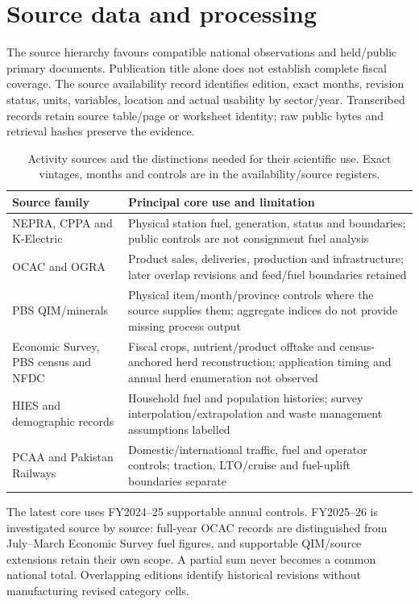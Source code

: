 \section{Source data and processing}\label{sec:sources}
The source hierarchy favours compatible national observations and held/public primary documents. Publication title alone does not establish complete fiscal coverage. The source availability record identifies edition, exact months, revision status, units, variables, location and actual usability by sector/year. Transcribed records retain source table/page or worksheet identity; raw public bytes and retrieval hashes preserve the evidence.

\begin{table}[htbp]\centering\small
\begin{tabular}{@{}p{.25\linewidth}p{.64\linewidth}@{}}\toprule
Source family & Principal core use and limitation\\\midrule
NEPRA, CPPA and K-Electric & Physical station fuel, generation, status and boundaries; public controls are not consignment fuel analysis\\
OCAC and OGRA & Product sales, deliveries, production and infrastructure; later overlap revisions and feed/fuel boundaries retained\\
PBS QIM/minerals & Physical item/month/province controls where the source supplies them; aggregate indices do not provide missing process output\\
Economic Survey, PBS census and NFDC & Fiscal crops, nutrient/product offtake and census-anchored herd reconstruction; application timing and annual herd enumeration not observed\\
HIES and demographic records & Household fuel and population histories; survey interpolation/extrapolation and waste management assumptions labelled\\
PCAA and Pakistan Railways & Domestic/international traffic, fuel and operator controls; traction, LTO/cruise and fuel-uplift boundaries separate\\\bottomrule
\end{tabular}
\caption{Activity sources and the distinctions needed for their scientific use. Exact vintages, months and controls are in the availability/source registers.}\label{tab:source_families}
\end{table}

The latest core uses FY2024--25 supportable annual controls. FY2025--26 is investigated source by source: full-year OCAC records are distinguished from July--March Economic Survey fuel figures, and supportable QIM/source extensions retain their own scope. A partial sum never becomes a common national total. Overlapping editions identify historical revisions without manufacturing revised category cells.

